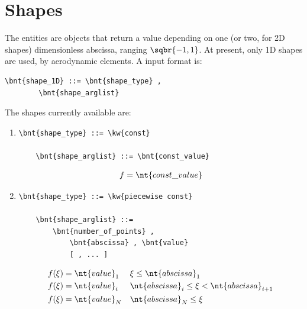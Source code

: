\section{Shapes}
\label{sec:Shape}
The  entities are objects that return a value depending on one
(or two, for 2D shapes) dimensionless abscissa, ranging $ \sqbr{-1,1} $.
At present, only 1D shapes are used, by aerodynamic elements.
A  input format is:
\begin{Verbatim}[commandchars=\\\{\}]
    \bnt{shape_1D} ::= \bnt{shape_type} ,
        \bnt{shape_arglist}
\end{Verbatim}
The shapes currently available are:
\begin{enumerate}
    \item {}
\begin{Verbatim}[commandchars=\\\{\}]
    \bnt{shape_type} ::= \kw{const}

    \bnt{shape_arglist} ::= \bnt{const_value}
\end{Verbatim}
\begin{align}
	f = \nt{const\_value}
\end{align}

    \item {}
\begin{Verbatim}[commandchars=\\\{\}]
    \bnt{shape_type} ::= \kw{piecewise const}

    \bnt{shape_arglist} ::=
        \bnt{number_of_points} , 
            \bnt{abscissa} , \bnt{value}
            [ , ... ]
\end{Verbatim}
\begin{subequations}
\begin{align}
	f(\xi) &= \nt{value}_1	&& \xi \le \nt{abscissa}_1
	\\
	f(\xi) &= \nt{value}_i	&& \nt{abscissa}_i \le \xi < \nt{abscissa}_{i+1}
	\\
	f(\xi) &= \nt{value}_N	&& \nt{abscissa}_N \le \xi
\end{align}
\end{subequations}


\end{enumerate}
